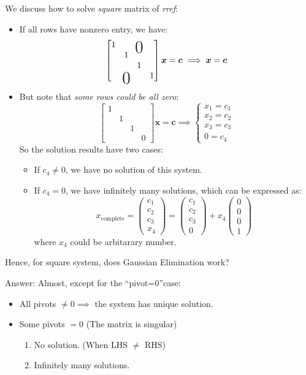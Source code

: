 \begin{example}
We discuss how to solve \emph{square} matrix of \emph{rref}:
\begin{itemize}
\item
If all rows have nonzero entry, we have:
\[
\begin{bmatrix}
1&&\bigzero&\\
&1&&\\
&&1&\\
&\bigzero&&1
\end{bmatrix}\bm x = \bm c
\implies \bm x = \bm c
\]
\item
But note that \textit{some rows could be all zero}:
\[
\begin{bmatrix}
1&&&\\
&1&&\\
&&1&\\
&&&0
\end{bmatrix}\bm x = \bm c\implies
\begin{cases}
x_1 = c_1\\
x_2 = c_2\\
x_3 = c_3\\
0 = c_4
\end{cases}
\]
So the solution results have two cases:
\begin{itemize}
\item
If $c_4\ne0$, we have no solution of this system.
\item
If $c_4=0$, we have infinitely many solutions, which can be expressed as:
\[
x_{\text{complete}} = \begin{pmatrix}
c_1\\c_2\\c_3\\x_4
\end{pmatrix} = \begin{pmatrix}
c_1\\c_2\\c_3\\0
\end{pmatrix}+x_4\begin{pmatrix}
0\\0\\0\\1
\end{pmatrix}
\]
where $x_4$ could be arbitarary number.
\end{itemize}
\end{itemize}
Hence, for square system, does Gaussian Elimination work?

Answer: Almost, except for the ``pivot=0''case:
\begin{itemize}
\item
All pivots $\ne0\implies$ the system has unique solution.
\item
Some pivots $=0$ (The matrix is singular)
\begin{enumerate}
\item
No solution. (When LHS $\ne$ RHS)
\item
Infinitely many solutions.
\end{enumerate}
\end{itemize}
\end{example}

